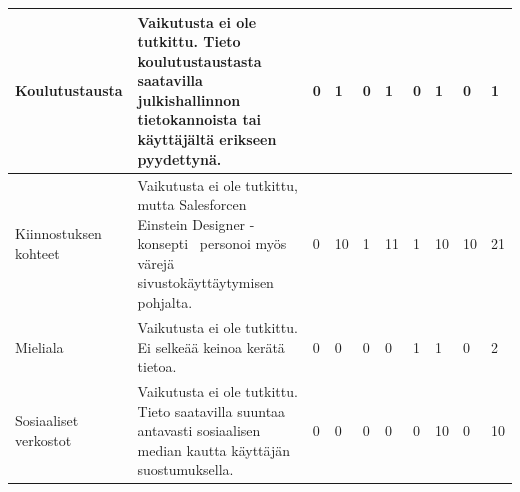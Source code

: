 \documentclass[finnish, 12pt, a4paper, elec, utf8, a-1b]{aaltothesis}
\begin{document}
{\begin{longtable}{p{2.5cm}|p{6cm}|p{0.5cm}p{0.5cm}p{0.5cm}|p{0.5cm}|p{0.5cm}p{0.5cm}p{0.5cm}|p{0.5cm}|}
    \midrule
    Koulutustausta                         & Vaikutusta ei ole tutkittu. Tieto koulutustaustasta saatavilla julkishallinnon tietokannoista tai käyttäjältä erikseen pyydettynä.                                                                                                                                                                                   & 0                                          & 1                                   & 0                                      & 1                            & 0                                               & 1                                         & 0                                         & 1                            \\
    \midrule
    Kiinnostuksen kohteet                  & Vaikutusta ei ole tutkittu, mutta Salesforcen Einstein Designer -konsepti~\cite{salesforce-einstein-designer} personoi myös värejä sivustokäyttäytymisen pohjalta.                                                                                                                                                                                       & 0                                          & 10                                  & 1                                      & 11                           & 1                                               & 10                                        & 10                                        & 21                           \\
    \midrule
    Mieliala                               & Vaikutusta ei ole tutkittu. Ei selkeää keinoa kerätä tietoa.                                                                                                                                                                                                                                                         & 0                                          & 0                                   & 0                                      & 0                            & 1                                               & 1                                         & 0                                         & 2                            \\
    \midrule
    Sosiaaliset verkostot                  & Vaikutusta ei ole tutkittu. Tieto saatavilla suuntaa antavasti sosiaalisen median kautta käyttäjän suostumuksella.                                                                                                                                                                                                   & 0                                          & 0                                   & 0                                      & 0                            & 0                                               & 10                                        & 0                                         & 10                           \\

\end{longtable}}
\end{document}
